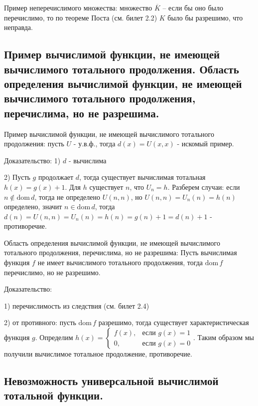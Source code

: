 \documentclass[a4paper, 10pt]{article}
\newcommand{\dom}{\text{dom}\,}
\begin{document}
\hfill

Пример неперечислимого множества: множество $\overline{K}$ -- если бы оно было перечислимо, то по теореме Поста (см. билет 2.2) $K$ было бы разрешимо, что неправда.

\subsection{Пример вычислимой функции, не имеющей вычислимого тотального продолжения. Область определения вычислимой функции, не имеющей вычислимого тотального продолжения, перечислима, но не разрешима.}

Пример вычислимой функции, не имеющей вычислимого тотального продолжения: пусть $U$ - у.в.ф., тогда $d(x)=U(x,x)$ - искомый пример.

Доказательство: 1) $d$ - вычислима

2) Пусть $g$ продолжает $d$, тогда существует вычислимая тотальная $h(x)=g(x)+1$. Для $h$ существует $n$, что $U_n=h$. Разберем случаи: если $n\not\in\dom d$, тогда не определено $U(n,n)$, но $U(n,n)=U_n(n)=h(n)$ определено, значит $n\in\dom d$, тогда $d(n)=U(n,n)=U_n(n)=h(n)=g(n)+1=d(n)+1$ - противоречие.

\hfill

Область определения вычислимой функции, не имеющей вычислимого тотального продолжения, перечислима, но не разрешима: Пусть вычислимая функция $f$ не имеет вычислимого тотального продолжения, тогда $\dom f$ перечислимо, но не разрешимо.

Доказательство:

1) перечислимость из следствия (см. билет 2.4)

2) от противного: пусть $\dom f$ разрешимо, тогда существует характеристическая функция $g$. Определим $h(x)=\begin{cases}
    f(x),&\text{если }g(x)=1 \\ 0,&\text{если }g(x)=0
\end{cases}$. Таким образом мы получили вычислимое тотальное продолжение, противоречие.

\subsection{Невозможность универсальной вычислимой тотальной функции.}
\end{document}
